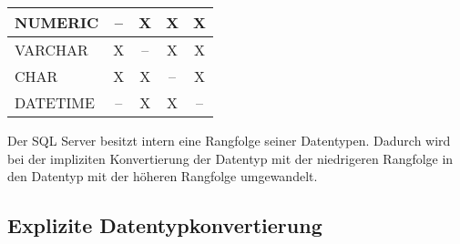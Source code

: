 \begin{center}
    \label{mssqlimplicit}
    \begin{small}
        \tabletail{
            \hline
        }
        \tablelasttail{
            \hline
        }
        \begin{supertabular}{|l|c|c|c|c|}
            NUMERIC   & -- & X  & X  & X \\
            \hline
            VARCHAR   & X  & -- & X  & X \\
            \hline
            CHAR      & X  & X  & -- & X \\
            \hline
            DATETIME  & -- & X  & X  & -- \\
        \end{supertabular}
    \end{small}
\end{center}
\begin{merke}
    Der SQL Server besitzt intern eine Rangfolge seiner Datentypen. Dadurch wird bei der impliziten Konvertierung der Datentyp mit der niedrigeren Rangfolge in den Datentyp mit der höheren Rangfolge umgewandelt.
\end{merke}
\begin{literaturinternet}
    \item \cite{autoId8}
    \item \cite{ms191530}
    \item \cite{ms190309}
\end{literaturinternet}
\clearpage
\subsection{Explizite Datentypkonvertierung}
